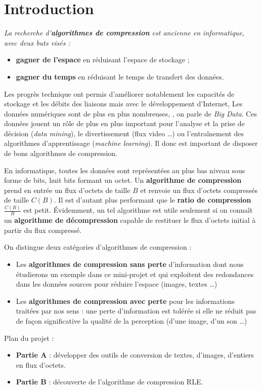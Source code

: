 \documentclass[a4paper, french, 12pt]{article}  %
\newcounter{thme}
\newcounter{alg}
\newcounter{prog}
\begin{document}
\setlength{\parindent}{0cm}

\section{Introduction}

{\itshape 
La recherche d'\textbf{algorithmes de compression} est ancienne en informatique, avec deux buts visés :
\begin{itemize}
	\item \textbf{gagner de l'espace} en réduisant l'espace de stockage ;
	\item \textbf{gagner du temps }en réduisant le temps de transfert des données.
\end{itemize}
Les progrès technique ont permis d'améliorer notablement les capacités de stockage et les débits des liaisons mais avec le développement d'Internet,  Les données numériques  sont de plus en plus nombreuses, , on parle de \textit{Big Data}. Ces données jouent un rôle de plus en plus important pour l'analyse  et la prise de décision (\textit{data mining}), le divertissement (flux video \ldots) ou l'entraînement des algorithmes d'apprentissage (\textit{machine learning}). Il donc est important de disposer de bons algorithmes de compression.

En informatique, toutes les données sont représentées au plus bas niveau sous forme de bits, huit bits formant un octet. 
Un \textbf{algorithme de compression}  prend en entrée un flux d'octets de taille $B$ et renvoie un flux d'octets compressés de taille $C(B)$. Il est d'autant plus performant que le \textbf{ratio de compression} $\frac{C(B)}{B}$ est petit. Évidemment, un tel algorithme est utile seulement si on connaît un \textbf{algorithme de décompression}  capable de restituer le flux d'octets initial à partir du flux compressé.

On distingue deux catégories d'algorithmes de compression :

\begin{itemize}
	\item Les \textbf{algorithmes de compression sans perte} d'information dont  nous étudierons un exemple dans ce mini-projet et qui exploitent des redondances dans les données sources pour réduire l'espace (images, textes \ldots)
	\item  Les \textbf{algorithmes de compression avec perte} pour les informations traitées par nos sens :   une perte d'information  est tolérée si elle ne réduit pas   de façon  significative  la qualité de la perception (d'une image, d'un son \ldots)
\end{itemize}


Plan du projet :
\begin{itemize}
	\item \textbf{Partie A} : développer des outils de conversion de textes, d'images, d'entiers en flux d'octets.
	\item \textbf{Partie B} : découverte de l'algorithme de compression RLE.
\end{itemize}

}
\end{document}
